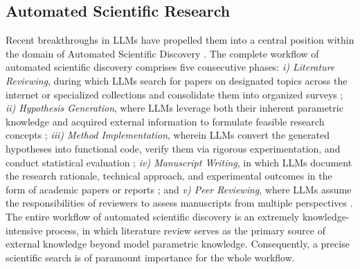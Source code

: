 \documentclass{llmxive}
\begin{document}
\subsection{Automated Scientific Research}
Recent breakthroughs in LLMs \citep{reasoning-survey,long-cot-survey} have propelled them into a central position within the domain of Automated Scientific Discovery \citep{dsgym,agent-laboratory,ai-scientist,how-far-ai-sci,datamind}.
The complete workflow of automated scientific discovery comprises five consecutive phases: \textit{i) Literature Reviewing}, during which LLMs search for papers on designated topics across the internet or specialized collections and consolidate them into organized surveys \citep{autosurvey,surveyx,opensholar,surveyforge,litllms}; \textit{ii) Hypothesis Generation}, where LLMs leverage both their inherent parametric knowledge and acquired external information to formulate feasible research concepts \citep{chain-of-ideas,virsci,deep-ideation,researchagent,scipip}; \textit{iii) Method Implementation}, wherein LLMs convert the generated hypotheses into functional code, verify them via rigorous experimentation, and conduct statistical evaluation \citep{alphaevolve,automind,ml-master,alpharesearch,aide}; \textit{iv) Manuscript Writing}, in which LLMs document the research rationale, technical approach, and experimental outcomes in the form of academic papers or reports \citep{overleafcoplilot,xtragpt}; and \textit{v) Peer Reviewing}, where LLMs assume the responsibilities of reviewers to assess manuscripts from multiple perspectives \citep{cycleresearcher,agentreview,reviewer2,deepreview}.
The entire workflow of automated scientific discovery is an extremely knowledge-intensive process, in which literature review serves as the primary source of external knowledge beyond model parametric knowledge.
Consequently, a precise scientific search is of paramount importance for the whole workflow.
\end{document}
